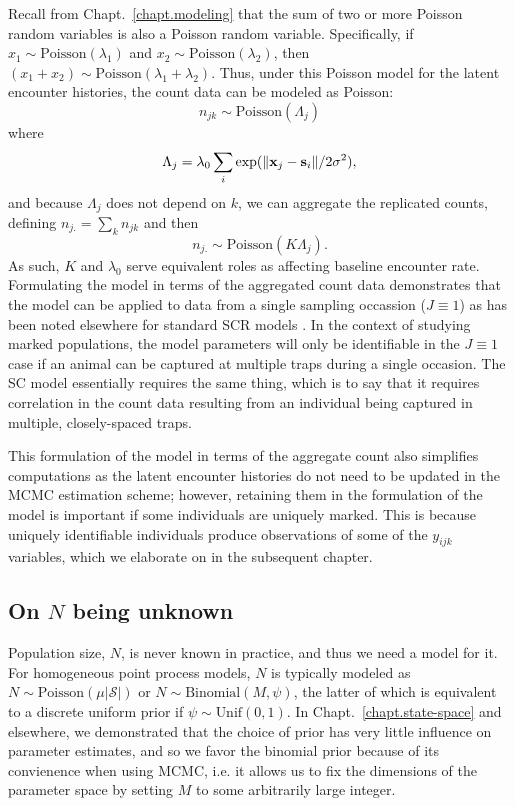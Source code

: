 Recall from Chapt.~\ref{chapt.modeling} that the sum of two or more
Poisson random variables is also a Poisson random variable.
Specifically,
if $x_1 \sim \text{Poisson}(\lambda_1)$ and
$x_2 \sim \text{Poisson}(\lambda_2)$, then $(x_1+x_2) \sim
\text{Poisson}(\lambda_1 + \lambda_2)$. Thus,
under this Poisson model for the latent encounter histories,
the count data can be modeled as Poisson:
\begin{equation}
n_{jk} \sim \mbox{Poisson}( \Lambda_{j} )
\label{eq:nagg}
\end{equation}
where
\[
 \Lambda_{j} = \lambda_0 \sum_{i} \exp(\| {\bf x}_j - {\bf s}_i \| / 2\sigma^2),
\]
and because $\Lambda_j$ does not depend on $k$, we can
aggregate the replicated counts, defining
$n_{j.} = \sum_{k} n_{jk}$ and then
\[
 n_{j.} \sim \mbox{Poisson}( K \Lambda_{j} ).
\]
As such, $K$ and $\lambda_{0}$ serve equivalent roles as affecting
baseline encounter rate.
Formulating the model in terms of the aggregated count data
demonstrates that the model can be
applied to data from a single sampling occassion ($J \equiv 1$) as has
been noted elsewhere for standard SCR models
\citep{efford_etal:2009ecol}. In the context of studying marked
populations, the model parameters will only be identifiable in the
$J\equiv 1$ case if an animal can be captured at multiple traps during
a single occasion. The SC model essentially requires the same thing,
which is to say that it requires correlation in the count data
resulting from an individual being captured in multiple,
closely-spaced traps.

This formulation of the model in terms of the aggregate count also
simplifies computations as the latent encounter histories
do not need to be updated in the MCMC estimation
scheme; however, retaining them in the formulation of the model
is important if some individuals are uniquely marked. %
This is because
uniquely identifiable individuals produce
observations of some of the $y_{ijk}$ variables, which we elaborate
on in the subsequent chapter.



\subsection{On $N$ being unknown}
\label{unmarked.sec.N}

Population size, $N$, is never known in practice, and thus %
we need a model for it. For homogeneous point process models,
$N$ is typically modeled as
$N \sim \text{Poisson}(\mu|\mathcal{S}|)$ or
$N \sim \text{Binomial}(M, \psi)$, the latter of which is equivalent
to a discrete uniform prior if $\psi \sim \text{Unif}(0,1)$. In
Chapt.~\ref{chapt.state-space} and elsewhere, we demonstrated that
the choice of prior has very little influence on parameter estimates,
and so we favor the binomial prior because of its convienence when
using MCMC, i.e. it allows us to fix the
dimensions of the parameter space by setting $M$ to some arbitrarily
large integer.

